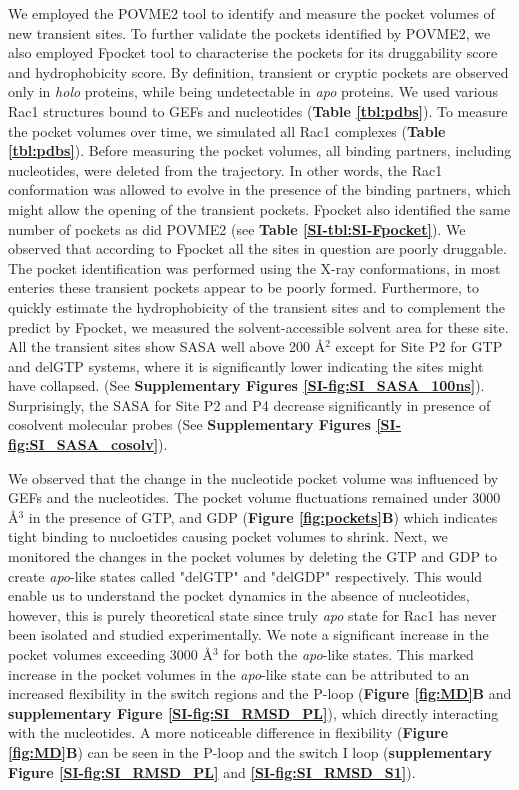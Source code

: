 \documentclass[12pt,a4paper]{achemso}
\begin{document}
We employed the POVME2\cite{durrant2014povme} tool to identify and measure the pocket volumes of new transient sites. To further validate the pockets identified by POVME2, we also employed Fpocket\cite{le2009fpocket} tool to characterise the pockets for its druggability score and hydrophobicity score. By definition, transient or cryptic pockets are observed only in \textit{holo} proteins, while being undetectable in \textit{apo} proteins. We used various Rac1 structures bound to GEFs and nucleotides (\textbf{Table \ref{tbl:pdbs}}). To measure the pocket volumes over time, we simulated all Rac1 complexes (\textbf{Table \ref{tbl:pdbs}}). Before measuring the pocket volumes, all binding partners, including nucleotides, were deleted from the trajectory. In other words, the Rac1 conformation was allowed to evolve in the presence of the binding partners, which might allow the opening of the transient pockets. Fpocket also identified the same number of pockets as did POVME2 (see \textbf{Table \ref{SI-tbl:SI-Fpocket}}).  We observed that according to Fpocket all the sites in question are poorly druggable. The pocket identification was performed using the X-ray conformations, in most enteries these transient pockets appear to be poorly formed. Furthermore, to quickly estimate the hydrophobicity of the transient sites and to complement the predict by Fpocket, we measured the solvent-accessible solvent area for these site.  All the transient sites show SASA well above 200 \r{A}$^2$ except for Site P2 for GTP and delGTP systems, where it is significantly lower indicating the sites might have collapsed. (See \textbf{Supplementary Figures \ref{SI-fig:SI_SASA_100ns}}). Surprisingly, the SASA for Site P2 and P4 decrease significantly in presence of cosolvent molecular probes (See \textbf{Supplementary Figures \ref{SI-fig:SI_SASA_cosolv}}).

We observed that the change in the nucleotide pocket volume was influenced by GEFs and the nucleotides. The pocket volume fluctuations remained under 3000 \r{A}$^3$ in the presence of GTP, and GDP (\textbf{Figure \ref{fig:pockets}B}) which indicates tight binding to nucloetides causing pocket volumes to shrink. Next, we monitored the changes in the pocket volumes by deleting the GTP and GDP to create \textit{apo}-like states called "delGTP" and "delGDP" respectively. This would enable us to understand the pocket dynamics in the absence of nucleotides, however, this is purely theoretical state since truly \textit{apo} state for Rac1 has never been isolated and studied experimentally.  We note a significant increase in the pocket volumes exceeding 3000 \r{A}$^3$ for both the \textit{apo}-like states. This marked increase in the pocket volumes in the \textit{apo}-like state can be attributed to an increased flexibility in the switch regions and the P-loop (\textbf{Figure \ref{fig:MD}B} and \textbf{supplementary Figure \ref{SI-fig:SI_RMSD_PL}}), which directly interacting with the nucleotides. A more noticeable difference in flexibility (\textbf{Figure \ref{fig:MD}B}) can be seen in the P-loop and the switch I loop (\textbf{supplementary Figure \ref{SI-fig:SI_RMSD_PL}} and \textbf{\ref{SI-fig:SI_RMSD_S1}}). 
\end{document}

